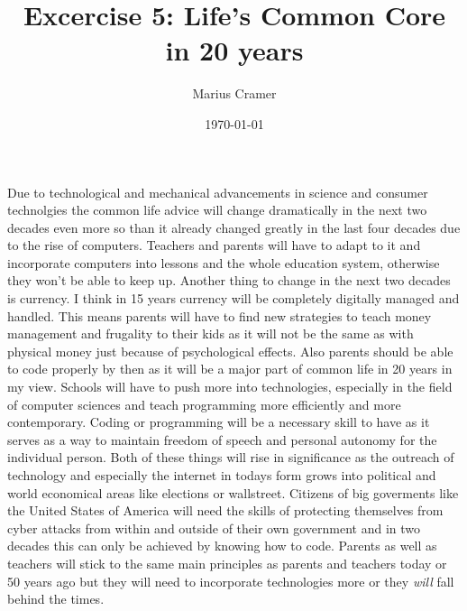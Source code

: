 \documentclass[12pt]{article}
\title{Excercise 5: Life's Common Core in 20 years}
\author{Marius Cramer}
\date{\today}
\begin{document}
\maketitle

Due to technological and mechanical advancements in science and consumer technolgies the common life advice will change dramatically in the next two decades even more so than it already changed greatly in the last four decades due to the rise of computers. Teachers and parents will have to adapt to it and incorporate computers into lessons and the whole education system, otherwise they won't be able to keep up. Another thing to change in the next two decades is currency. I think in 15 years currency will be completely digitally managed and handled. This means parents will have to find new strategies to teach money management and frugality to their kids as it will not be the same as with physical money just because of psychological effects. Also parents should be able to code properly by then as it will be a major part of common life in 20 years in my view. Schools will have to push more into technologies, especially in the field of computer sciences and teach programming more efficiently and more contemporary. Coding or programming will be a necessary skill to have as it serves as a way to maintain freedom of speech and personal autonomy for the individual person. Both of these things will rise in significance as the outreach of technology and especially the internet in todays form grows into political and world economical areas like elections or wallstreet. Citizens of big goverments like the United States of America will need the skills of protecting themselves from cyber attacks from within and outside of their own government and in two decades this can only be achieved by knowing how to code. Parents as well as teachers will stick to the same main principles as parents and teachers today or 50 years ago but they will need to incorporate technologies more or they \textit{will} fall behind the times.
\end{document}

